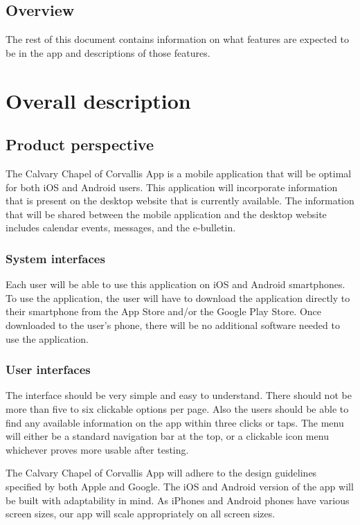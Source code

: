 \documentclass[letterpaper,10pt,draftclsnofoot,onecolumn,compsoc,titlepage]{IEEEtran}
\begin{document}
	\subsection{Overview}
	 The rest of this document contains information on what features are expected to be in the app and descriptions of those features.

	\section{Overall description}
	\subsection{Product perspective}
	The Calvary Chapel of Corvallis App is a mobile application that will be optimal for both iOS and Android users.
	This application will incorporate information that is present on the desktop website that is currently available.
	The information that will be shared between the mobile application and the desktop website includes calendar events, messages, and the e-bulletin.

	\subsubsection{System interfaces}
	Each user will be able to use this application on iOS and Android smartphones.
	To use the application, the user will have to download the application directly to their smartphone from the App Store and/or the Google Play Store.
	Once downloaded to the user's phone, there will be no additional software needed to use the application.

	\subsubsection{User interfaces}
	The interface should be very simple and easy to understand.
	There should not be more than five to six clickable options per page.
	Also the users should be able to find any available information on the app within three clicks or taps.
	The menu will either be a standard navigation bar at the top, or a clickable icon menu whichever proves more usable after testing.

	The Calvary Chapel of Corvallis App will adhere to the design guidelines specified by both Apple and Google.
	The iOS and Android version of the app will be built with adaptability in mind.
	As iPhones and Android phones have various screen sizes, our app will scale appropriately on all screen sizes.
\end{document}
